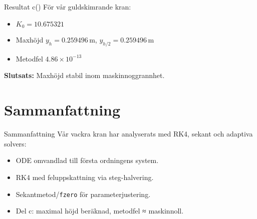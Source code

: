 \documentclass{beamer}
\begin{document}
\begin{frame}{Resultat c()}
  \small För vår guldskimrande kran:
  \begin{itemize}
    \item $K_0=10.675321$
    \item Maxhöjd $y_h=0.259496$\,m, $y_{h/2}=0.259496$\,m
    \item Metodfel $4.86\times10^{-13}$
  \end{itemize}
  \textbf{Slutsats:} Maxhöjd stabil inom maskinnoggrannhet.
\end{frame}

\section{Sammanfattning}
\begin{frame}{Sammanfattning}
  \small Vår vackra kran har analyserats med RK4, sekant och adaptiva solvers:
  \begin{itemize}
    \item ODE omvandlad till första ordningens system.
    \item RK4 med feluppskattning via steg-halvering.
    \item Sekantmetod/\texttt{fzero} för parameterjustering.
    \item Del c: maximal höjd beräknad, metodfel ≈ maskinnoll.
  \end{itemize}
\end{frame}
\end{document}
